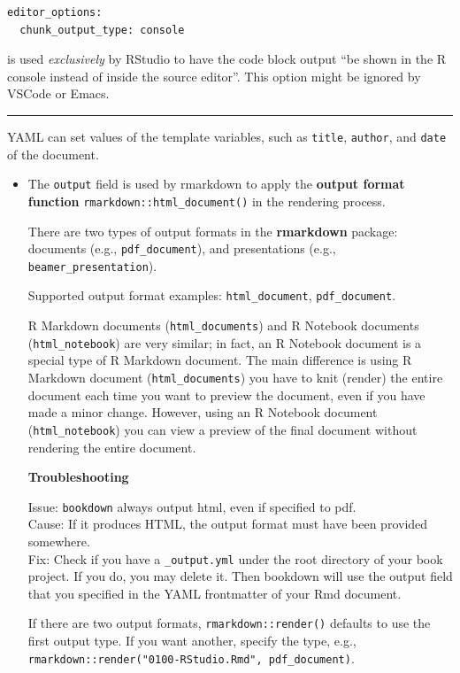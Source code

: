 \documentclass[
  a4paper,
  twoside,
  openright]{book}
\theoremstyle{definition}
\theoremstyle{definition}
\theoremstyle{definition}
\theoremstyle{definition}
\theoremstyle{remark}
\begin{document}
\begin{verbatim}
editor_options:
  chunk_output_type: console
\end{verbatim}

is used \emph{exclusively} by RStudio to have the code block output ``be shown in the R console instead of inside the source editor''. This option might be ignored by VSCode or Emacs.

\begin{center}\rule{0.5\linewidth}{0.5pt}\end{center}

YAML can set values of the template variables, such as \texttt{title}, \texttt{author}, and \texttt{date} of the document.

\begin{itemize}
\item
  The \texttt{output} field is used by rmarkdown to apply the {\textbf{output format function}} \texttt{rmarkdown::html\_document()} in the rendering process.

  There are two types of output formats in the \textbf{rmarkdown} package: documents (e.g., \texttt{pdf\_document}), and presentations (e.g., \texttt{beamer\_presentation}).

  Supported output format examples: \texttt{html\_document}, \texttt{pdf\_document}.

  R Markdown documents (\texttt{html\_documents}) and R Notebook documents (\texttt{html\_notebook}) are very similar; in fact, an R Notebook document is a special type of R Markdown document. The main difference is using R Markdown document (\texttt{html\_documents}) you have to knit (render) the entire document each time you want to preview the document, even if you have made a minor change. However, using an R Notebook document (\texttt{html\_notebook}) you can view a preview of the final document without rendering the entire document.

  \textbf{Troubleshooting}

  Issue: \texttt{bookdown} always output html, even if specified to pdf.\\
  Cause: If it produces HTML, the output format must have been provided somewhere.\\
  Fix: Check if you have a \texttt{\_output.yml} under the root directory of your book project. If you do, you may delete it. Then bookdown will use the output field that you specified in the YAML frontmatter of your Rmd document.

  If there are two output formats, \texttt{rmarkdown::render()} defaults to use the first output type. If you want another, specify the type, e.g., \texttt{rmarkdown::render("0100-RStudio.Rmd",\ \textquotesingle{}pdf\_document\textquotesingle{})}.
\end{itemize}
\end{document}
